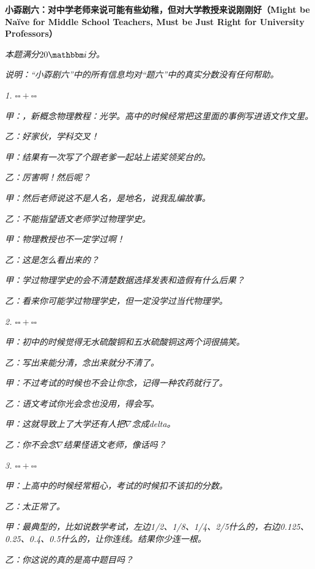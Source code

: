 \documentclass[11pt,a4paper,onecolumn,UTF8]{ctexart}
\begin{document}
	\newpage
	\noindent
	\textbf{小孬剧六：对中学老师来说可能有些幼稚，但对大学教授来说刚刚好（Might be Na\"ive for Middle School Teachers, Must be Just Right for University Professors）}
	
	\textit{本题满分$20\ui$分。}
	
	\textit{说明：“小孬剧六”中的所有信息均对“题六”中的真实分数没有任何帮助。}
	
	\textit{1. $\square\square+\square\square$}
	
	\textit{甲：，新概念物理教程：光学。高中的时候经常把这里面的事例写进语文作文里。}
	
	\textit{乙：好家伙，学科交叉！}
	
	\textit{甲：结果有一次写了个跟老爹一起站上诺奖领奖台的。}
	
	\textit{乙：厉害啊！然后呢？}
	
	\textit{甲：然后老师说这不是人名，是地名，说我乱编故事。\faMapMarker}
	
	\textit{乙：不能指望语文老师学过物理学史。}
	
	\textit{甲：物理教授也不一定学过啊！}
	
	\textit{乙：这是怎么看出来的？}
	
	\textit{甲：学过物理学史的会不清楚数据选择发表和造假有什么后果？}
	
	\textit{乙：看来你可能学过物理学史，但一定没学过当代物理学。}
	
	\textit{2. $\square\square+\square\square$}
	
	\textit{甲：初中的时候觉得无水硫酸铜和五水硫酸铜这两个词很搞笑。}
	
	\textit{乙：写出来能分清，念出来就分不清了。}
	
	\textit{甲：不过考试的时候也不会让你念，记得一种农药就行了。\faMapMarker}
	
	\textit{乙：语文考试你光会念也没用，得会写。}
	
	\textit{甲：这就导致上了大学还有人把$\nabla$念成delta。}
	
	\textit{乙：你不会念$\nabla$结果怪语文老师，像话吗？}
	
	\textit{3. $\square\square+\square\square$}
	
	\textit{甲：上高中的时候经常粗心，考试的时候扣不该扣的分数。}
	
	\textit{乙：太正常了。}
	
	\textit{甲：最典型的，比如说数学考试，左边1/2、1/8、1/4、2/5什么的，右边0.125、0.25、0.4、0.5什么的，让你连线。结果你少连一根。}
	
	\textit{乙：你这说的真的是高中题目吗？}
	
\end{document}
